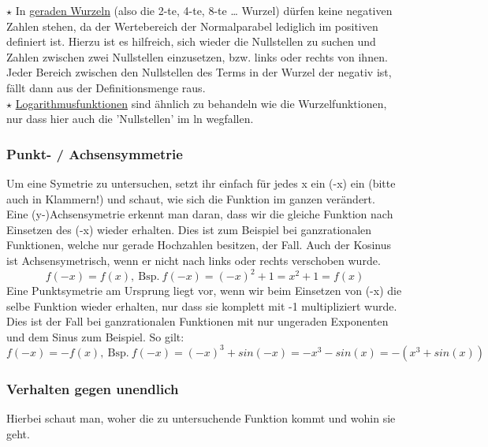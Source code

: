 		\(\star\) In \underline{geraden Wurzeln} (also die 2-te, 4-te, 8-te \ldots
		Wurzel) dürfen keine negativen Zahlen stehen, da der Wertebereich der
		Normalparabel lediglich im positiven definiert ist. Hierzu ist es hilfreich,
		sich wieder die Nullstellen zu suchen und Zahlen zwischen zwei Nullstellen
		einzusetzen, bzw. links oder rechts von ihnen. Jeder Bereich zwischen den
		Nullstellen des Terms in der Wurzel der negativ ist, fällt dann aus der
		Definitionsmenge raus.\\

		\(\star\) \underline{Logarithmusfunktionen} sind ähnlich zu behandeln wie die
		Wurzelfunktionen, nur dass hier auch die 'Nullstellen' im ln wegfallen.

	\subsubsection{Punkt- / Achsensymmetrie}
		Um eine Symetrie zu untersuchen, setzt ihr einfach für jedes x ein (-x) ein
		(bitte auch in Klammern!) und schaut, wie sich die Funktion im ganzen
		verändert.\\
		Eine (y-)Achsensymetrie erkennt man daran, dass wir die gleiche Funktion nach
		Einsetzen des (-x) wieder erhalten. Dies ist zum Beispiel bei ganzrationalen
		Funktionen, welche nur gerade Hochzahlen besitzen, der Fall. Auch der Kosinus
		ist Achsensymetrisch, wenn er nicht nach links oder rechts verschoben wurde.
		\[f(-x)=f(x),\mathrm{\ Bsp.\ } f(-x)=(-x)^2+1=x^2+1=f(x)\]
		Eine Punktsymetrie am Ursprung liegt vor, wenn wir beim Einsetzen von (-x) die
		selbe Funktion wieder erhalten, nur dass sie komplett mit -1 multipliziert
		wurde. Dies ist der Fall bei ganzrationalen Funktionen mit nur ungeraden
		Exponenten und dem Sinus zum Beispiel. So gilt:
		\[f(-x)=-f(x),\mathrm{\ Bsp.\ }
		f(-x)=(-x)^3+sin(-x)=-x^3-sin(x)=-(x^3+sin(x))\]

	\subsubsection{Verhalten gegen unendlich}
		Hierbei schaut man, woher die zu untersuchende Funktion kommt und wohin sie
		geht.\\

